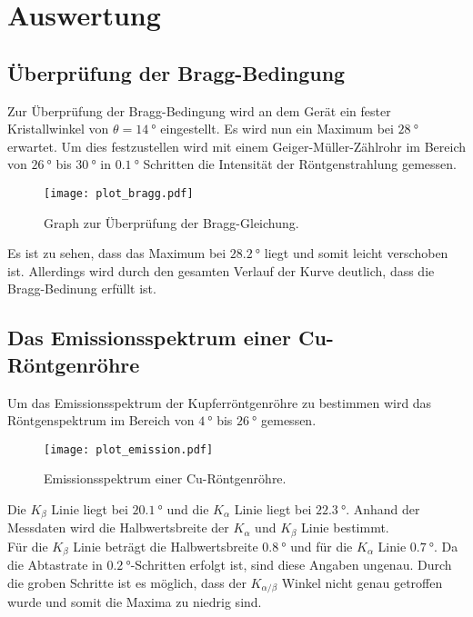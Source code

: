 \newpage
\section{Auswertung}
\label{sec:Auswertung}

\subsection{Überprüfung der Bragg-Bedingung}
Zur Überprüfung der Bragg-Bedingung wird an dem Gerät ein fester Kristallwinkel von
$\theta = \SI{14}{\degree}$ eingestellt. Es wird nun ein Maximum bei $\SI{28}{\degree}$
erwartet. Um dies festzustellen wird mit einem Geiger-Müller-Zählrohr im Bereich von
$\SI{26}{\degree}$ bis $\SI{30}{\degree}$ in $\SI{0.1}{\degree}$ Schritten die Intensität
der Röntgenstrahlung gemessen.

\begin{figure}[H]
  \centering
  \texttt{[image: plot\_bragg.pdf]}
  \caption{Graph zur Überprüfung der Bragg-Gleichung.}
  \label{fig:plot_bragg}
\end{figure}

Es ist zu sehen, dass das Maximum bei $\SI{28.2}{\degree}$ liegt und somit leicht verschoben
ist. Allerdings wird durch den gesamten Verlauf der Kurve deutlich, dass die Bragg-Bedinung
erfüllt ist.


\subsection{Das Emissionsspektrum einer Cu-Röntgenröhre}

Um das Emissionsspektrum der Kupferröntgenröhre zu bestimmen wird das Röntgenspektrum
im Bereich von $\SI{4}{\degree}$ bis $\SI{26}{\degree}$ gemessen.

\begin{figure}[H]
  \centering
  \texttt{[image: plot\_emission.pdf]}
  \caption{Emissionsspektrum einer Cu-Röntgenröhre.}
  \label{fig:plot_emission}
\end{figure}

Die $K_\beta$ Linie liegt bei $\SI{20.1}{\degree}$ und die $K_\alpha$ Linie liegt bei $\SI{22.3}{\degree}$.
Anhand der Messdaten wird die Halbwertsbreite der $K_\alpha$ und $K_\beta$ Linie bestimmt. \\
Für die $K_\beta$ Linie beträgt die Halbwertsbreite $\SI{0.8}{\degree}$ und für die
$K_\alpha$ Linie $\SI{0.7}{\degree}$. Da die Abtastrate in $\SI{0.2}{\degree}$-Schritten erfolgt
ist, sind diese Angaben ungenau. Durch die groben Schritte ist es möglich, dass der
$K_{\alpha/\beta}$ Winkel nicht genau getroffen wurde und somit die Maxima zu niedrig sind. \\

